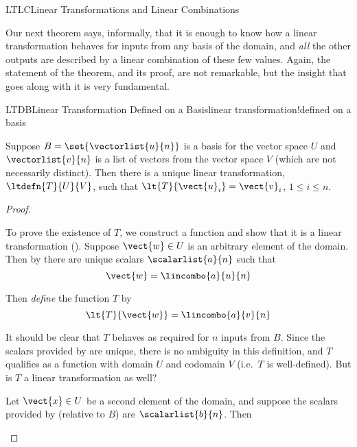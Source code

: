 \begin{subsect}{LTLC}{Linear Transformations and Linear Combinations}
%
\begin{para}Our next theorem says, informally, that it is enough to know how a linear transformation behaves for inputs from any basis of the domain, and {\em all} the other outputs are described by a linear combination of these few values.  Again, the statement of the theorem, and its proof, are not remarkable, but the insight that goes along with it is very fundamental.\end{para}
%
\begin{theorem}{LTDB}{Linear Transformation Defined on a Basis}{linear transformation!defined on a basis}
\begin{para}Suppose $B=\set{\vectorlist{u}{n}}$ is a basis for the vector space $U$ and $\vectorlist{v}{n}$ is a list of vectors from the vector space $V$ (which are not necessarily distinct).   Then there is a unique linear transformation, $\ltdefn{T}{U}{V}$, such that $\lt{T}{\vect{u}_i}=\vect{v}_i$, $1\leq i\leq n$.\end{para}
%
\end{theorem}
%
\begin{proof}
%
\begin{para}To prove the existence of $T$, we construct a function and show that it is a linear transformation ().  Suppose $\vect{w}\in U$ is an arbitrary element of the domain.  Then by  there are unique scalars $\scalarlist{a}{n}$ such that
%
\begin{equation*}
\vect{w}=\lincombo{a}{u}{n}
\end{equation*}
\end{para}
%
\begin{para}Then {\em define} the function $T$ by
%
\begin{equation*}
\lt{T}{\vect{w}}=\lincombo{a}{v}{n}
\end{equation*}
\end{para}
%
\begin{para}It should be clear that $T$ behaves as required for $n$ inputs from $B$.  Since the scalars provided by  are unique, there is no ambiguity in this definition, and $T$ qualifies as a function with domain $U$ and codomain $V$ (i.e.\ $T$ is well-defined).  But is $T$ a linear transformation as well?\end{para}
%
\begin{para}Let $\vect{x}\in U$ be a second element of the domain, and suppose the scalars provided by  (relative to $B$) are $\scalarlist{b}{n}$.  Then

\end{para}
\end{proof}
\end{subsect}
